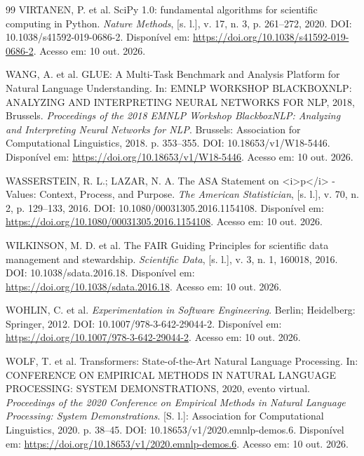 \begin{thebibliography}{99}
 VIRTANEN, P. et al. SciPy 1.0: fundamental algorithms for scientific computing in Python. \textit{Nature Methods}, [s. l.], v. 17, n. 3, p. 261--272, 2020. DOI: 10.1038/s41592-019-0686-2. Disponível em: \url{https://doi.org/10.1038/s41592-019-0686-2}. Acesso em: 10 out. 2026.

 WANG, A. et al. GLUE: A Multi-Task Benchmark and Analysis Platform for Natural Language Understanding. In: EMNLP WORKSHOP BLACKBOXNLP: ANALYZING AND INTERPRETING NEURAL NETWORKS FOR NLP, 2018, Brussels. \textit{Proceedings of the 2018 EMNLP Workshop BlackboxNLP: Analyzing and Interpreting Neural Networks for NLP}. Brussels: Association for Computational Linguistics, 2018. p. 353--355. DOI: 10.18653/v1/W18-5446. Disponível em: \url{https://doi.org/10.18653/v1/W18-5446}. Acesso em: 10 out. 2026.

 WASSERSTEIN, R. L.; LAZAR, N. A. The ASA Statement on <i>p</i> -Values: Context, Process, and Purpose. \textit{The American Statistician}, [s. l.], v. 70, n. 2, p. 129--133, 2016. DOI: 10.1080/00031305.2016.1154108. Disponível em: \url{https://doi.org/10.1080/00031305.2016.1154108}. Acesso em: 10 out. 2026.

 WILKINSON, M. D. et al. The FAIR Guiding Principles for scientific data management and stewardship. \textit{Scientific Data}, [s. l.], v. 3, n. 1, 160018, 2016. DOI: 10.1038/sdata.2016.18. Disponível em: \url{https://doi.org/10.1038/sdata.2016.18}. Acesso em: 10 out. 2026.

 WOHLIN, C. et al. \textit{Experimentation in Software Engineering}. Berlin; Heidelberg: Springer, 2012. DOI: 10.1007/978-3-642-29044-2. Disponível em: \url{https://doi.org/10.1007/978-3-642-29044-2}. Acesso em: 10 out. 2026.

 WOLF, T. et al. Transformers: State-of-the-Art Natural Language Processing. In: CONFERENCE ON EMPIRICAL METHODS IN NATURAL LANGUAGE PROCESSING: SYSTEM DEMONSTRATIONS, 2020, evento virtual. \textit{Proceedings of the 2020 Conference on Empirical Methods in Natural Language Processing: System Demonstrations}. [S. l.]: Association for Computational Linguistics, 2020. p. 38--45. DOI: 10.18653/v1/2020.emnlp-demos.6. Disponível em: \url{https://doi.org/10.18653/v1/2020.emnlp-demos.6}. Acesso em: 10 out. 2026.


\end{thebibliography}
